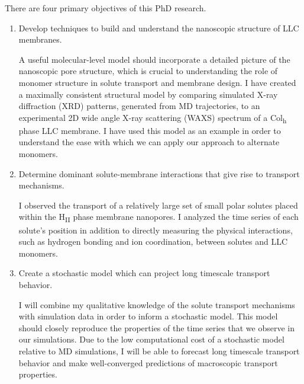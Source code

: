 \documentclass{article}
\begin{document}
  \noindent There are four primary objectives of this PhD research.
  \begin{enumerate}
  
    \item Develop techniques to build and understand the nanoscopic structure
    of LLC membranes.


    A useful molecular-level model should incorporate a detailed picture 
    of the nanoscopic pore structure, which is crucial to understanding
    the role of monomer structure in solute transport and membrane design.
    I have created a maximally consistent structural model by comparing 
    simulated X-ray diffraction (XRD) patterns, generated from MD trajectories,
    to an experimental 2D wide angle X-ray scattering (WAXS) spectrum of a 
    Col\textsubscript{h} phase LLC membrane. I have used this model as an 
    example in order to understand the ease with which we can apply our approach
    to alternate monomers. 
    
%    
    
    \item Determine dominant solute-membrane interactions that give rise to
    transport mechanisms.
    
    I observed the transport of a relatively large set of small polar solutes
    placed within the H\textsubscript{II} phase membrane nanopores. I analyzed
    the time series of each solute's position in addition to directly measuring
    the physical interactions, such as hydrogen bonding and ion coordination, 
    between solutes and LLC monomers.
    
    \item Create a stochastic model which can project long timescale 
    transport behavior.
    
    I will combine my qualitative knowledge of the solute transport mechanisms
    with simulation data in order to inform a stochastic model. This model
    should closely reproduce the properties of the time series that we observe 
    in our simulations. Due to the low computational cost of a stochastic model
    relative to MD simulations, I will be able to forecast long timescale transport
    behavior and make well-converged predictions of macroscopic transport properties.
           

\end{enumerate}
\end{document}
